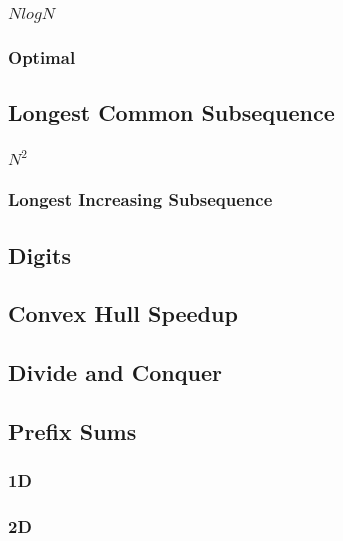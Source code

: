 \documentclass{article}
\begin{document}
\subsubsection{$N log N$}

\subsubsection{Optimal}


\subsection{Longest Common Subsequence}
\subsubsection{$N^{2}$}

\subsubsection{Longest Increasing Subsequence}


\subsection{Digits}


\subsection{Convex Hull Speedup}

\subsection{Divide and Conquer}


\subsection{Prefix Sums}
\subsubsection{1D}

\subsubsection{2D}

\end{document}
